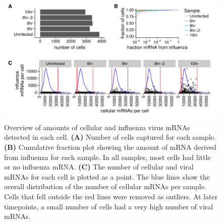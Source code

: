 \documentclass[9pt,lineno]{elife}
\begin{document}
\begin{figure}
\includegraphics[width=\linewidth]{figures/p_cell_mRNA_summary.pdf}
\caption{
Overview of amounts of cellular and influenza virus mRNAs detected in each cell.
{\bf (A)} 
Number of cells captured for each sample.
{\bf (B)} 
Cumulative fraction plot showing the amount of mRNA derived from influenza for each sample.
In all samples, most cells had little or no influenza mRNA.
{\bf (C)} 
The number of cellular and viral mRNAs for each cell is plotted as a point.
The blue lines show the overall distribution of the number of cellular mRNAs per sample.
Cells that fell outside the red lines were removed as outliers.
At later timepoints, a small number of cells had a very high number of viral mRNAs.
}
\label{fig:cells}
\end{figure}
\end{document}
